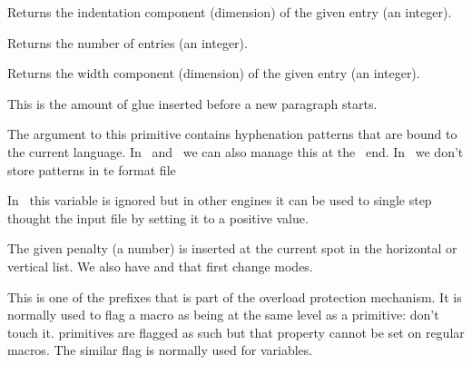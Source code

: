 \stopoldprimitive

\startoldprimitive[title={\prm {parshapeindent}}]

Returns the indentation component (dimension) of the given entry (an integer).

\stopoldprimitive

\startoldprimitive[title={\prm {parshapelength}}]

Returns the number of entries (an integer).

\stopoldprimitive

\startnewprimitive[title={\prm {parshapewidth}}]

Returns the width component (dimension) of the given entry (an integer).

\stopnewprimitive

\startoldprimitive[title={\prm {parskip}}]

This is the amount of glue inserted before a new paragraph starts.

\stopoldprimitive

\startoldprimitive[title={\prm {patterns}}]

The argument to this primitive contains hyphenation patterns that are bound to
the current language. In \LUATEX\ and \LUAMETATEX\ we can also manage this at the
\LUA\ end. In \LUAMETATEX\ we don't store patterns in te format file

\stopoldprimitive

\startoldprimitive[title={\prm {pausing}}][obsolete=yes]

In \LUAMETATEX\ this variable is ignored but in other engines it can be used to
single step thought the input file by setting it to a positive value.

\stopoldprimitive

\startoldprimitive[title={\prm {penalty}}]

The given penalty (a number) is inserted at the current spot in the horizontal or
vertical list. We also have  and  that first change
modes.

\stopoldprimitive

\startnewprimitive[title={\prm {permanent}}]

This is one of the prefixes that is part of the overload protection mechanism. It
is normally used to flag a macro as being at the same level as a primitive: don't
touch it. primitives are flagged as such but that property cannot be set on
regular macros. The similar  flag is normally used for variables.


